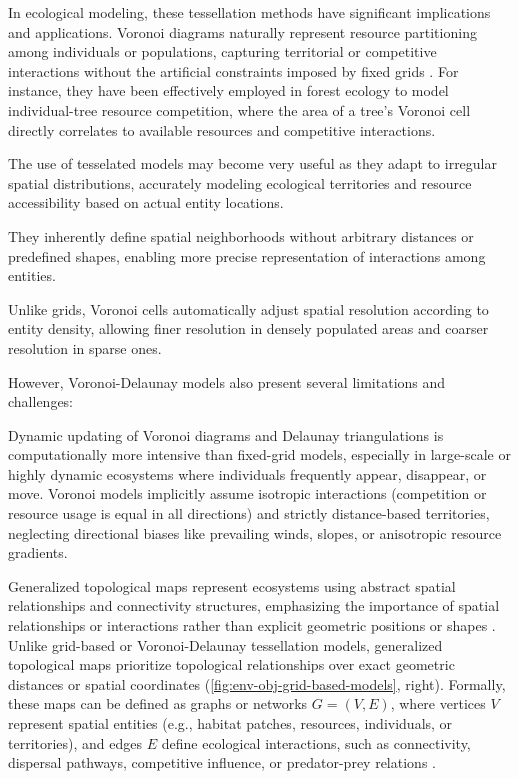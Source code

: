 In ecological modeling, these tessellation methods have significant implications and applications. Voronoi diagrams naturally represent resource partitioning among individuals or populations, capturing territorial or competitive interactions without the artificial constraints imposed by fixed grids \cite{Castle2006}. For instance, they have been effectively employed in forest ecology to model individual-tree resource competition, where the area of a tree's Voronoi cell directly correlates to available resources and competitive interactions.

The use of tesselated models may become very useful as they adapt to irregular spatial distributions, accurately modeling ecological territories and resource accessibility based on actual entity locations.

They inherently define spatial neighborhoods without arbitrary distances or predefined shapes, enabling more precise representation of interactions among entities.

Unlike grids, Voronoi cells automatically adjust spatial resolution according to entity density, allowing finer resolution in densely populated areas and coarser resolution in sparse ones.

However, Voronoi-Delaunay models also present several limitations and challenges:
\begin{Itemize}
    \Item{} Dynamic updating of Voronoi diagrams and Delaunay triangulations is computationally more intensive than fixed-grid models, especially in large-scale or highly dynamic ecosystems where individuals frequently appear, disappear, or move.
    \Item{} Voronoi models implicitly assume isotropic interactions (competition or resource usage is equal in all directions) and strictly distance-based territories, neglecting directional biases like prevailing winds, slopes, or anisotropic resource gradients.
\end{Itemize}


Generalized topological maps represent ecosystems using abstract spatial relationships and connectivity structures, emphasizing the importance of spatial relationships or interactions rather than explicit geometric positions or shapes \cite{Urban2009}. Unlike grid-based or Voronoi-Delaunay tessellation models, generalized topological maps prioritize topological relationships over exact geometric distances or spatial coordinates (\cref{fig:env-obj-grid-based-models}, right). Formally, these maps can be defined as graphs or networks $G = (V, E)$, where vertices $V$ represent spatial entities (e.g., habitat patches, resources, individuals, or territories), and edges $E$ define ecological interactions, such as connectivity, dispersal pathways, competitive influence, or predator-prey relations \cite{Hamonic2021,Minor2008,Peterson2024}.

